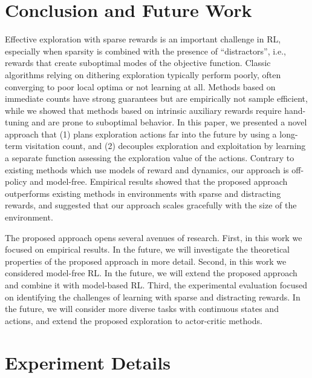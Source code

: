 \documentclass{article}
\begin{document}
\section{Conclusion and Future Work}
\label{app:concl}
Effective exploration with sparse rewards is an important challenge in RL, especially when sparsity is combined with the presence of ``distractors'', i.e., rewards that create suboptimal modes of the objective function. 
Classic algorithms relying on dithering exploration typically perform poorly, often converging to poor local optima or not learning at all.
Methods based on immediate counts have strong guarantees but are empirically not sample efficient, while we showed that methods based on intrinsic auxiliary rewards require hand-tuning and are prone to suboptimal behavior. 
In this paper, we presented a novel approach that (1) plans exploration actions far into the future by using a long-term visitation count, and (2) decouples exploration and exploitation by learning a separate function assessing the exploration value of the actions. 
Contrary to existing methods which use models of reward and dynamics, our approach is off-policy and model-free. 
Empirical results showed that the proposed approach outperforms existing methods in environments with sparse and distracting rewards, and suggested that our approach scales gracefully with the size of the environment. 

The proposed approach opens several avenues of research. First, in this work we focused on empirical results. In the future, we will investigate the theoretical properties of the proposed approach in more detail.
Second, in this work we considered model-free RL. In the future, we will extend the proposed approach and combine it with model-based RL.
Third, the experimental evaluation focused on identifying the challenges of learning with sparse and distracting rewards. In the future, we will consider more diverse tasks with continuous states and actions, and extend the proposed exploration to actor-critic methods.





\clearpage

\appendix 
\setlength\parindent{0pt}

\section{Experiment Details}
\label{app:tab_details}
\end{document}
